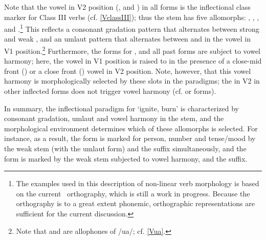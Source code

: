 Note that the vowel in V2 position (,  and ) in all forms is the inflectional class marker for Class III verbs (cf. \SEC\ref{VclassIII}); thus the stem has five allomorphs: , , \mbox{,}  and .\footnote{The examples used in this description of non-linear verb morphology is based on the current \PS\ orthography, which is still a work in progress. Because the orthography is to a great extent phonemic, orthographic representations are sufficient for the current discussion.} 
This reflects a consonant gradation pattern that alternates between strong  and weak , and an umlaut pattern that alternates between  and  in the vowel in V1 position.\footnote{Note that  and  are allophones of /ua/; cf. \SEC\ref{Vua}.} 
Furthermore, the forms for ,  and all past forms are subject to vowel harmony; here, the vowel in V1 position is raised to  in the presence of a close-mid front () or a close front () vowel in V2 position. Note, however, that this vowel harmony is morphologically selected by these slots in the paradigms; the  in V2 in other inflected forms does not trigger vowel harmony (cf.  or  forms). 


In summary, the inflectional paradigm for  ‘ignite, burn’ is characterized by consonant gradation, umlaut and vowel harmony in the stem, and the morphological environment determines which of these allomorphs is selected. %
For instance, as a result, the  form  is marked for person, number and tense/mood by the weak  stem (with the  umlaut form) and the  suffix simultaneously, and the  form  is marked by the weak  stem subjected to vowel harmony, and the  suffix. 

